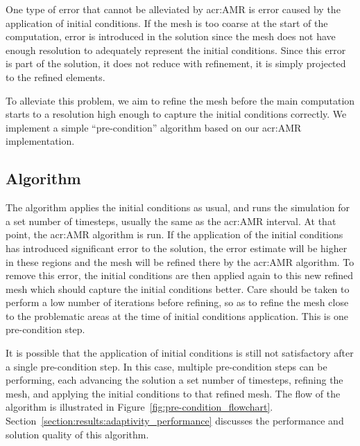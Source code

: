 One type of error that cannot be alleviated by \acrshort{acr:AMR} is error caused by the application
of initial conditions. If the mesh is too coarse at the start of the computation, error is
introduced in the solution since the mesh does not have enough resolution to adequately represent
the initial conditions. Since this error is part of the solution, it does not reduce with
refinement, it is simply projected to the refined elements.

To alleviate this problem, we aim to refine the mesh before the main computation starts to a
resolution high enough to capture the initial conditions correctly. We implement a simple
``pre-condition'' algorithm based on our \acrshort{acr:AMR} implementation. 

\subsection{Algorithm}\label{section:adaptive_mesh_refinement:pre_conditioning:algorithm}

The algorithm applies the initial conditions as usual, and runs the simulation for a set number of
timesteps, usually the same as the \acrshort{acr:AMR} interval. At that point, the
\acrshort{acr:AMR} algorithm is run. If the application of the initial conditions has introduced
significant error to the solution, the error estimate will be higher in these regions and the mesh
will be refined there by the \acrshort{acr:AMR} algorithm. To remove this error, the initial
conditions are then applied again to this new refined mesh which should capture the initial
conditions better. Care should be taken to perform a low number of iterations before refining, so as
to refine the mesh close to the problematic areas at the time of initial conditions application.
This is one pre-condition step.

It is possible that the application of initial conditions is still not satisfactory after a single
pre-condition step. In this case, multiple pre-condition steps can be performing, each advancing the
solution a set number of timesteps, refining the mesh, and applying the initial conditions to that
refined mesh. The flow of the algorithm is illustrated in Figure~\ref{fig:pre-condition_flowchart}.
Section~\ref{section:results:adaptivity_performance} discusses the performance and solution quality
of this algorithm.


